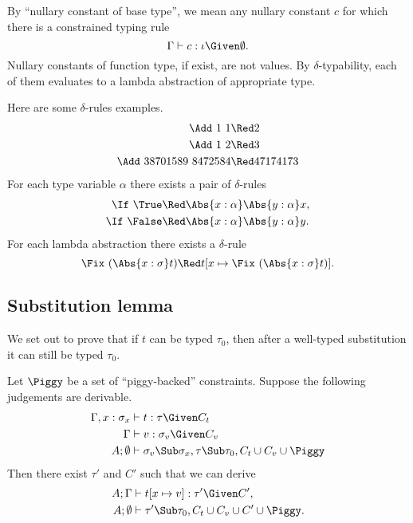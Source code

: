 \documentclass{amsart}
\theoremstyle{definition}
\begin{document}
By ``nullary constant of base type'', we mean any nullary
constant $c$ for which there is a constrained typing rule
\[
\Gamma\vdash c:\iota\Given\emptyset.
\]
Nullary constants of function type, if exist, are not values. By
$\delta$-typability, each of them evaluates to a lambda
abstraction of appropriate type.

Here are some $\delta$-rules examples.
\begin{align*}
\Add~1~1&\Red2\\
\Add~1~2&\Red3\\
\Add~38701589~8472584&\Red47174173
\end{align*}
For each type variable
$\alpha$ there exists a pair of $\delta$-rules
\begin{align*}
\If~\True &\Red\Abs{x:\alpha}\Abs{y:\alpha}x,\\
\If~\False&\Red\Abs{x:\alpha}\Abs{y:\alpha}y.
\end{align*}
For each lambda abstraction there exists a $\delta$-rule
\[
\Fix~(\Abs{x:\sigma} t)\Red t[x\mapsto \Fix~(\Abs{x:\sigma} t)].
\]

\subsection{Substitution lemma}
\label{sublem}
We set out to prove that if $t$ can be typed $\tau_0$, then after
a well-typed substitution it can still be typed $\tau_0$.

Let $\Piggy$ be a set of ``piggy-backed'' constraints. Suppose
the following judgements are derivable.
\begin{align}
\Gamma,x:\sigma_x&\vdash t:\tau\Given C_t \notag
\\
\Gamma&\vdash v:\sigma_v \Given C_v \notag
\\
A;\emptyset&\vdash
\sigma_v\Sub\sigma_x, \tau\Sub\tau_0,C_t\cup C_v\cup\Piggy
\label{eq:subass}
\end{align}
Then there exist $\tau'$ and $C'$ such that we can derive
\begin{align*}
A;\Gamma&\vdash t[x\mapsto v] : \tau'\Given C',\\
A;\emptyset &\vdash \tau'\Sub\tau_0, C_t\cup C_v\cup C'\cup\Piggy.
\end{align*}
\end{document}

